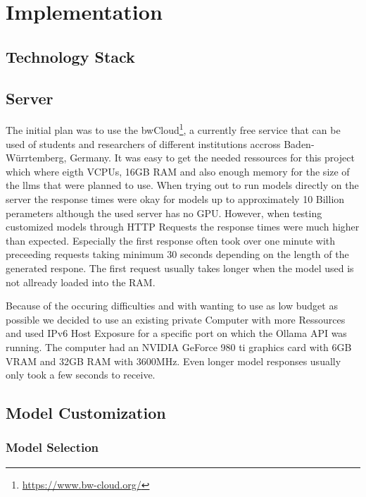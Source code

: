 
\chapter{Implementation}
\label{chap:implementation}

\section{Technology Stack}


\section{Server}
The initial plan was to use the bwCloud\footnote{\url{https://www.bw-cloud.org/}}, a currently free service that can be used of students and researchers of different institutions accross Baden-Würrtemberg, Germany.
It was easy to get the needed ressources for this project which where eigth VCPUs, 16GB RAM and also enough memory for the size of the \glspl{llm} that were planned to use.
When trying out to run models directly on the server the response times were okay for models up to approximately 10 Billion perameters although the used server has no GPU.
However, when testing customized models through HTTP Requests the response times were much higher than expected.
Especially the first response often took over one minute with preceeding requests taking minimum 30 seconds depending on the length of the generated respone.
The first request usually takes longer when the model used is not allready loaded into the RAM.

Because of the occuring difficulties and with wanting to use as low budget as possible we decided to use an existing private Computer with more Ressources and used IPv6 Host Exposure for a specific port on which the Ollama API was running.
The computer had an NVIDIA GeForce 980 ti graphics card with 6GB VRAM and 32GB RAM with 3600MHz.
Even longer model responses usually only took a few seconds to receive.

\section{Model Customization}
\subsection{Model Selection}


